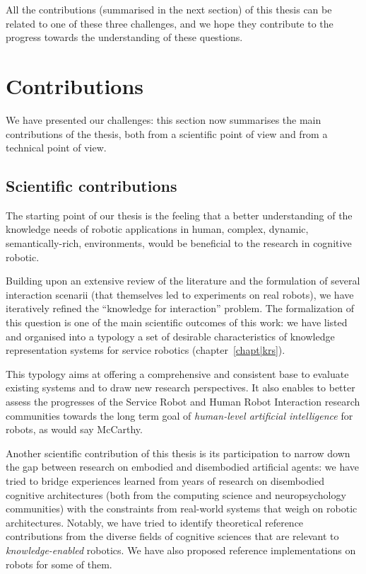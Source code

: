 All the contributions (summarised in the next section) of this thesis can be
related to one of these three challenges, and we hope they contribute to the
progress towards the understanding of these questions.



\section{Contributions}
\label{sect|contributions}

We have presented our challenges: this section now summarises the main
contributions of the thesis, both from a scientific point of view and from a
technical point of view.

\subsection{Scientific contributions}
\label{sect|scientific-contributions}

The starting point of our thesis is the feeling that a better understanding of
the knowledge needs of robotic applications in human, \ie complex, dynamic,
semantically-rich, environments, would be beneficial to the research in
cognitive robotic.

Building upon an extensive review of the literature and the formulation of
several interaction scenarii (that themselves led to experiments on real
robots), we have iteratively refined the ``knowledge for interaction'' problem.
The formalization of this question is one of the main scientific outcomes of
this work: we have listed and organised into a typology a set of desirable
characteristics of knowledge representation systems for service robotics
(chapter~\ref{chapt|krs}).

This typology aims at offering a comprehensive and consistent base to evaluate
existing systems and to draw new research perspectives. It also enables to
better assess the progresses of the Service Robot and Human Robot Interaction
research communities towards the long term goal of \emph{human-level artificial
intelligence} for robots, as would say McCarthy.

Another scientific contribution of this thesis is its participation to narrow
down the gap between research on embodied and disembodied artificial agents: we
have tried to bridge experiences learned from years of research on disembodied
cognitive architectures (both from the computing science and neuropsychology
communities) with the constraints from real-world systems that weigh on robotic
architectures. Notably, we have tried to identify theoretical reference
contributions from the diverse fields of cognitive sciences that are relevant
to \emph{knowledge-enabled} robotics. We have also proposed reference
implementations on robots for some of them.

